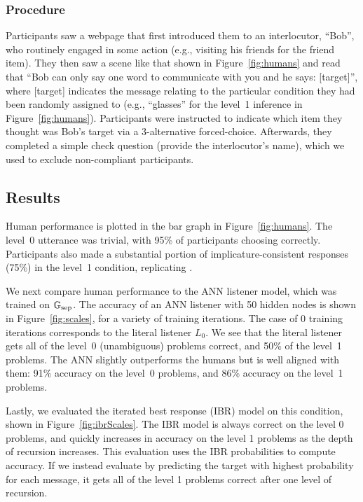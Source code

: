 \subsubsection{Procedure}

Participants saw a webpage that first introduced them to an
interlocutor, ``Bob'', who routinely engaged in some action (e.g.,
visiting his friends for the friend item). They then saw a scene like
that shown in Figure~\ref{fig:humans} and read that ``Bob can only say
one word to communicate with you and he says: [target]'', where
[target] indicates the message relating to the particular condition
they had been randomly assigned to (e.g., ``glasses'' for the level~1
inference in Figure~\ref{fig:humans}).  Participants were instructed
to indicate which item they thought was Bob's target via a
3-alternative forced-choice. Afterwards, they completed a simple check
question (provide the interlocutor's name), which we used to exclude
non-compliant participants.

\subsection{Results}

Human performance is plotted in the bar graph in
Figure~\ref{fig:humans}. The level~0 utterance was trivial, with 95\%
of participants choosing correctly. Participants also made a
substantial portion of implicature-consistent responses (75\%) in the
level~1 condition, replicating \cite{Stiller:Goodman:Frank:2011}.

We next compare human performance to the ANN listener model, which was
trained on $\mathbb{G}_{\text{sep}}$. The accuracy of an ANN listener with 50 hidden
nodes is shown in Figure~\ref{fig:scales}, for a variety of training
iterations. The case of 0 training iterations corresponds to the
literal listener $L_{0}$. We see that the literal listener gets all of
the level~0 (unambiguous) problems correct, and 50\% of the level~1
problems. The ANN slightly outperforms the humans but is well aligned
with them: 91\% accuracy on the level~0 problems, and 86\% accuracy on
the level~1 problems.


Lastly, we evaluated the iterated best response (IBR) model on this
condition, shown in Figure~\ref{fig:ibrScales}. The IBR model is
always correct on the level 0 problems, and quickly increases in
accuracy on the level 1 problems as the depth of recursion
increases. This evaluation uses the IBR probabilities to compute
accuracy. If we instead evaluate by predicting the target with highest
probability for each message, it gets all of the level 1 problems
correct after one level of recursion.


